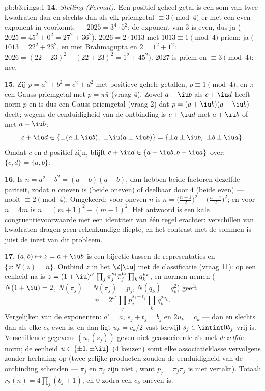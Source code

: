 \begin{solution}{pb:b3:rings:1}
\textbf{14.} \emph{Stelling (Fermat).} Een positief geheel getal is
een som van twee kwadraten dan en slechts dan als elk priemgetal
$\equiv 3 \pmod 4$ er met een even exponent in voorkomt. ---
$2025 = 3^4 \cdot 5^2$: de exponent van $3$ is even, dus ja ($2025
= 45^2 + 0^2 = 27^2 + 36^2$). $2026 = 2 \cdot 1013$ met $1013
\equiv 1 \pmod 4$ priem: ja ($1013 = 22^2 + 23^2$, en met
Brahmagupta en $2 = 1^2+1^2$: $2026 = (22 - 23)^2 + (22 + 23)^2 =
1^2 + 45^2$). $2027$ is priem en $\equiv 3 \pmod 4$: nee.

\textbf{15.} Zij $p = a^2 + b^2 = c^2 + d^2$ met positieve gehele
getallen, $p \equiv 1 \pmod 4$, en $\pi$ een Gauss-priemgetal met
$p = \pi\bar\pi$ (vraag 4). Zowel $a + \iu b$ als $c + \iu d$ heeft
norm $p$ en is dus een Gauss-priemgetal (vraag 2) dat $p = (a+\iu
b)(a - \iu b)$ deelt; wegens de eenduidigheid van de ontbinding is
$c + \iu d$  met $a + \iu b$ of met $a - \iu b$:
\[
c + \iu d \in \{\pm(a \pm \iu b),\ \pm\iu(a \pm \iu b)\}
= \{\pm a \pm \iu b,\ \pm b \pm \iu a\}.
\]
Omdat $c$ en $d$ positief zijn, blijft $c + \iu d \in \{a + \iu b,
b + \iu a\}$ over: $\{c, d\} = \{a, b\}$.

\textbf{16.} Is $n = a^2 - b^2 = (a-b)(a+b)$, dan hebben beide
factoren dezelfde pariteit, zodat $n$ oneven is (beide oneven) of
deelbaar door $4$ (beide even) --- nooit $\equiv 2 \pmod 4$.
Omgekeerd: voor oneven $n$ is $n = \bigl(\frac{n+1}2\bigr)^2 -
\bigl(\frac{n-1}2\bigr)^2$; en voor $n = 4m$ is $n = (m+1)^2 -
(m-1)^2$. Het antwoord is een kale congruentievoorwaarde met een
identiteit van één regel erachter: verschillen van kwadraten
dragen geen rekenkundige diepte, en het contrast met de sommen is
juist de inzet van dit probleem.

\textbf{17.} $(a, b) \mapsto z = a + \iu b$ is een bijectie tussen
de representaties en $\{z : N(z) = n\}$. Ontbind $z$ in het 
$\Z[\iu]$ met de classificatie (vraag 11): op een eenheid na is $z
= (1+\iu)^{a'}\prod_j\pi_j^{s_j}\bar\pi_j^{t_j}
\prod_kq_k^{u_k}$, en normen nemen ($N(1+\iu) = 2$, $N(\pi_j) =
N(\bar\pi_j) = p_j$, $N(q_k) = q_k^2$) geeft
\[
n = 2^{a'}\prod_jp_j^{s_j + t_j}\prod_kq_k^{2u_k} .
\]
Vergelijken van de exponenten: $a' = a$, $s_j + t_j = b_j$ en
$2u_k = c_k$ ---  dan en slechts dan als elke $c_k$ even
is, en dan ligt $u_k = c_k/2$ vast terwijl $s_j \in \intint0{b_j}$
vrij is. Verschillende gegevens $(u, (s_j))$ geven niet-geassocieerde
$z$'s met \emph{dezelfde} norm; de eenheid $u \in \{\pm1, \pm\iu\}$
(4 keuzen) somt elke associatieklasse vervolgens zonder herhaling
op (twee gelijke producten zouden de eenduidigheid van de
ontbinding schenden --- $\pi_j$ en $\bar\pi_j$ zijn niet
, want $p_j = \pi_j\bar\pi_j$ is niet vertakt). Totaal:
$r_2(n) = 4\prod_j(b_j + 1)$, en $0$ zodra een $c_k$ oneven is.


\end{solution}
